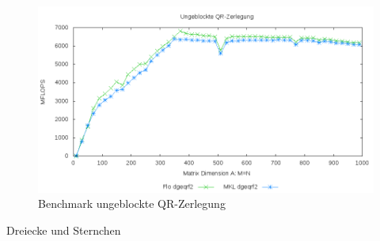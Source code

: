 \begin{figure}[H]
	\includegraphics[width=\textwidth]{images/unblk.png}
	\caption{Benchmark ungeblockte QR-Zerlegung}
	\label{img:unblk}
\end{figure}

Dreiecke und Sternchen









	 
